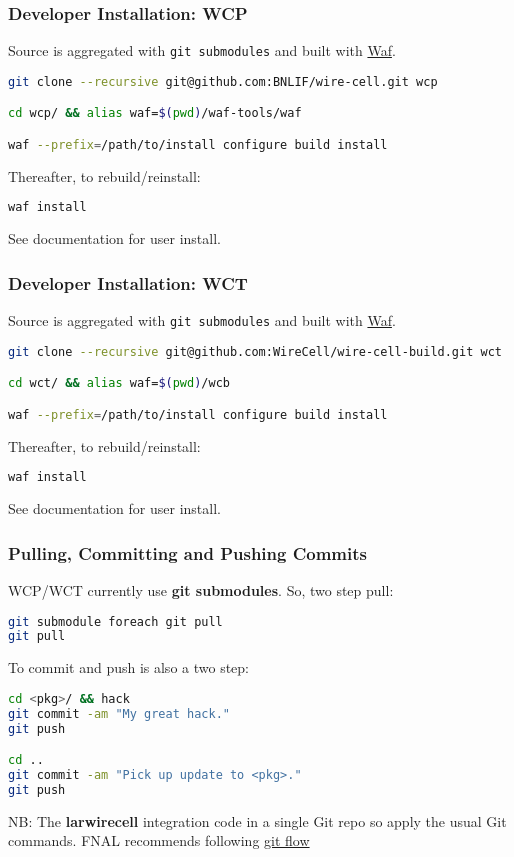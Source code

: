 \documentclass[xcolor=dvipsnames]{beamer}
\begin{document}
\begin{frame}[fragile]
  \frametitle{Developer Installation: WCP}

  Source is aggregated with \texttt{git submodules} and built with
  \href{https://waf.io/}{Waf}.

\begin{lstlisting}[language=bash]
git clone --recursive git@github.com:BNLIF/wire-cell.git wcp

cd wcp/ && alias waf=$(pwd)/waf-tools/waf

waf --prefix=/path/to/install configure build install
\end{lstlisting}
  Thereafter, to rebuild/reinstall:
\begin{lstlisting}[language=sh]
waf install
\end{lstlisting}

  See documentation for user install.
\end{frame}


\begin{frame}[fragile]
  \frametitle{Developer Installation: WCT}

  Source is aggregated with \texttt{git submodules} and built with
  \href{https://waf.io/}{Waf}.

\begin{lstlisting}[language=sh]
git clone --recursive git@github.com:WireCell/wire-cell-build.git wct

cd wct/ && alias waf=$(pwd)/wcb

waf --prefix=/path/to/install configure build install
\end{lstlisting}
  Thereafter, to rebuild/reinstall:
\begin{lstlisting}[language=sh]
waf install
\end{lstlisting}

  See documentation for user install.
\end{frame}

\begin{frame}[fragile]
  \frametitle{Pulling, Committing and Pushing Commits} 

    WCP/WCT currently use \textbf{git submodules}.  So, two step pull:
\begin{lstlisting}[language=sh]
git submodule foreach git pull
git pull
\end{lstlisting}


  To commit and push is also a two step:
\begin{lstlisting}[language=sh]
cd <pkg>/ && hack
git commit -am "My great hack."
git push

cd ..
git commit -am "Pick up update to <pkg>."
git push
\end{lstlisting}

  \vfill
  \footnotesize
  NB: The \textbf{larwirecell} integration code in a single Git repo
  so apply the usual Git commands. FNAL recommends following
  \href{http://nvie.com/posts/a-successful-git-branching-model/}{git
    flow}

\end{frame}
\end{document}
